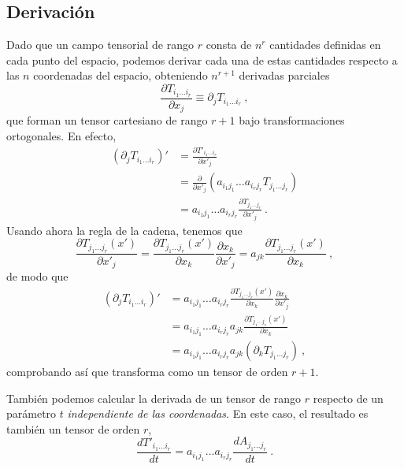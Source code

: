 \subsection{Derivación}

Dado que un campo tensorial de rango $r$ consta de $n^r$ cantidades definidas en cada punto del espacio, podemos derivar cada una de estas cantidades respecto a las $n$ coordenadas del espacio, obteniendo $n^{r+1}$ derivadas parciales
\begin{equation}
    \frac{\partial T_{i_1 \dots i_r}}{\partial x_j} \equiv \partial_j T_{i_1 \dots i_r} \ ,
\end{equation}
que forman un tensor cartesiano de rango $r+1$ bajo transformaciones ortogonales. En efecto,
\begin{align}
    (\partial_j T_{i_1 \dots i_r})' & = \frac{\partial T'_{i_1 \dots i_r}}{\partial x'_j} \\
    & = \frac{\partial}{\partial x'_j}(a_{i_1 j_1} \dots a_{i_r j_r} T_{j_1 \dots j_r}) \\
    & = a_{i_1 j_1} \dots a_{i_r j_r} \frac{\partial T_{j_1 \dots j_r}}{\partial x'_j} \ .
\end{align}
Usando ahora la regla de la cadena, tenemos que
\begin{equation}
    \frac{\partial T_{j_1 \dots j_r}(x')}{\partial x'_j} = \frac{\partial T_{j_1 \dots j_r}(x')}{\partial x_k} \frac{\partial x_k}{\partial x'_j} = a_{jk} \frac{\partial T_{j_1 \dots j_r}(x')}{\partial x_k}\ ,
\end{equation}
de modo que
\begin{align}
    (\partial_j T_{i_1 \dots i_r})' & = a_{i_1 j_1} \dots a_{i_r j_r} \frac{\partial T_{j_1 \dots j_r}(x')}{\partial x_k} \frac{\partial x_k}{\partial x'_j} \\
    & = a_{i_1 j_1} \dots a_{i_r j_r}  a_{jk} \frac{\partial T_{j_1 \dots j_r}(x')}{\partial x_k} \\
    & = a_{i_1 j_1} \dots a_{i_r j_r}  a_{jk} (\partial_k T_{j_1 \dots j_r}) \ ,
\end{align}
comprobando así que transforma como un tensor de orden $r+1$.

También podemos calcular la derivada de un tensor de rango $r$ respecto de un parámetro $t$ \emph{independiente de las coordenadas}. En este caso, el resultado es también un tensor de orden $r$,
\begin{equation}
    \frac{d T'_{i_1 \dots i_r}}{dt} = a_{i_1 j_1} \dots a_{i_r j_r} \frac{dA_{j_1 \dots j_r}}{dt} \ . 
\end{equation}

